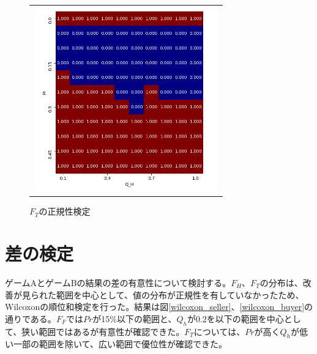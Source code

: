 \documentclass[a4paper,fontsize=11pt,report,notitlepage,line_length=38zw,number_of_lines=40,dvipdfmx]{jlreq}
\begin{document}
\begin{figure}[hbtp]
\begin{center}
\begin{tabular}{c}
      \begin{minipage}{0.5\hsize}
        \begin{center}
          \includegraphics[width=8cm]{SW_test_buyer_gameA.png}
          \caption{$F_T$の正規性検定}
           \label{SW_test_buyer_gameA}
        \end{center}
      \end{minipage}
    \end{tabular}
  \end{center}
\end{figure}


\section{差の検定}
ゲームAとゲームBの結果の差の有意性について検討する。$F_H$、$F_T$の分布は、改善が見られた範囲を中心として、値の分布が正規性を有していなかったため、Wilcoxonの順位和検定を行った。結果は図\ref{wilcoxon_seller}、\ref{wilcoxon_buyer}の通りである。$F_F$では$Pr$が15\%以下の範囲と、$Q_h$が0.2を以下の範囲を中心として、狭い範囲ではあるが有意性が確認できた。$F_T$については、$Pr$が高く$Q_h$が低い一部の範囲を除いて、広い範囲で優位性が確認できた。
\end{document}
